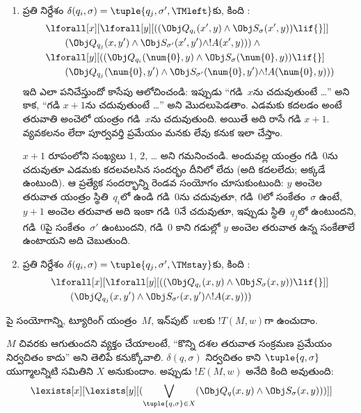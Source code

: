 \documentclass[../../../include/open-logic-section]{subfiles}
\begin{document}
\begin{enumerate}
\begin{enumerate}
\item {} ప్రతి నిర్దేశం $\delta(q_i, \sigma) =
  \tuple{q_j, \sigma', \TMleft}$కు, కింది :
\begin{align*}
& \lforall[x][\lforall[y][
    ((\Obj Q_{q_i}(x', y) \land \Obj S_{\sigma}(x', y)) \lif {}]]\\
& \qquad   (\Obj Q_{q_j}(x, y') \land \Obj S_{\sigma'}(x', y') \land
!A(x', y))) \land {}\\
& \lforall[y][((\Obj Q_{q_i}(\num{0}, y) \land \Obj S_{\sigma}(\num{0},
    y)) \lif {}]\\
& \qquad (\Obj Q_{q_j}(\num{0}, y') \land \Obj S_{\sigma'}(\num{0},
  y') \land !A(\num{0}, y)))
\end{align*}
ఇది ఎలా పనిచేస్తుందో కాసేపు ఆలోచించండి: ఇప్పుడు ``గడి~$x$ను చదువుతుంటే
\dots'' అని కాక, ``గడి $x+1$ను చదువుతుంటే \dots'' అని మొదలుపెడతాం. ఎడమకు
కదలడం అంటే తరువాతి అంచెలో యంత్రం గడి~$x$ను చదువుతుంది. అయితే అది రాసే గడి
$x+1$. వ్యవకలనం లేదా పూర్వవర్తి ప్రమేయం మనకు లేవు కనుక ఇలా చేస్తాం.

$x+1$ రూపంలోని సంఖ్యలు $1$, $2$, \dots{} అని గమనించండి. అందువల్ల యంత్రం
గడి~$0$ను చదువుతూ ఎడమకు కదలవలసిన సందర్భం దీనిలో లేదు (అది కదలలేదు;
అక్కడే ఉంటుంది). ఆ ప్రత్యేక సందర్భాన్ని రెండవ సంయోగం చూసుకుంటుంది: $y$
అంచెల తరువాత యంత్రం స్థితి~$q_i$లో ఉండి గడి~$0$ను చదువుతూ, గడి~$0$లో
సంకేతం~$\sigma$ ఉంటే, $y+1$ అంచెల తరువాత అది ఇంకా గడి~$0$నే చదువుతూ,
ఇప్పుడు స్థితి~$q_j$లో ఉంటుందని, గడి~$0$పై సంకేతం~$\sigma'$ ఉంటుందని,
గడి~$0$ కాని గడుల్లో $y$ అంచెల తరువాత ఉన్న సంకేతాలే ఉంటాయని అది చెబుతుంది.
\item {} ప్రతి నిర్దేశం $\delta(q_i, \sigma) =
  \tuple{q_j, \sigma', \TMstay}$కు, కింది :
\begin{align*}
& \lforall[x][\lforall[y][(
   (\Obj Q_{q_i}(x, y) \land \Obj S_{\sigma}(x, y)) \lif {}]] \\
&\qquad   (\Obj Q_{q_j}(x, y') \land \Obj S_{\sigma'}(x, y') \land
!A(x, y)))
\end{align*}
\end{enumerate}
\end{enumerate}
పై  సంయోగాన్ని, ట్యూరింగ్ యంత్రం~$M$, ఇన్‌పుట్~$w$లకు
$!T(M, w)$గా ఉంచుదాం.

$M$ చివరకు ఆగుతుందని వ్యక్తం చేయాలంటే, ``కొన్ని దశల తరువాత సంక్రమణ
ప్రమేయం నిర్వచితం కాదు'' అని తెలిపే  కనుక్కోవాలి.
$\delta(q, \sigma)$ నిర్వచితం కాని $\tuple{q, \sigma}$ యుగ్మాలన్నిటి సమితిని
$X$ అనుకుందాం. అప్పుడు $!E(M, w)$ అనేది కింది  అవుతుంది:
\[
\lexists[x][\lexists[y][(\bigvee_{\tuple{q, \sigma} \in
      X}(\Obj Q_q(x, y) \land \Obj S_\sigma(x, y)))]]
\]
\end{document}
